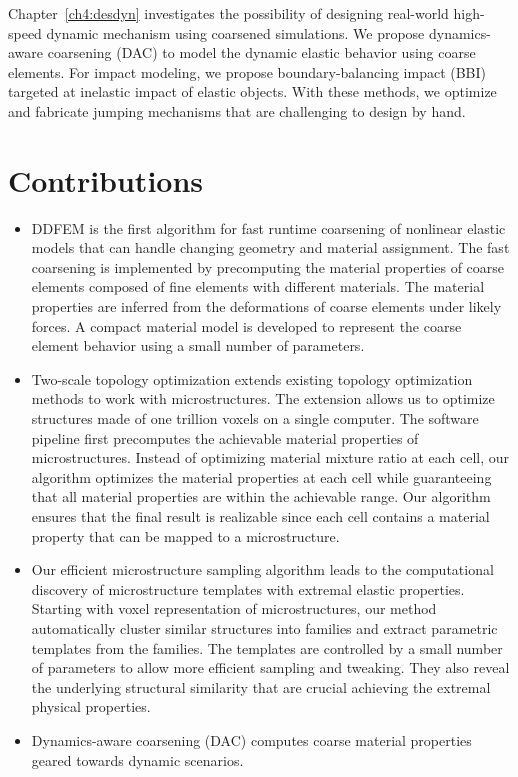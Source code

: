Chapter~\ref{ch4:desdyn} investigates the possibility of designing real-world high-speed dynamic mechanism using coarsened simulations.
We propose dynamics-aware coarsening (DAC) to model the dynamic elastic behavior using coarse elements.
For impact modeling, we propose boundary-balancing impact (BBI) targeted at inelastic impact of elastic objects.
With these methods, we optimize and fabricate jumping mechanisms that are challenging to design by hand.
\section{Contributions}
\begin{itemize}
	\item DDFEM is the first algorithm for fast runtime coarsening of nonlinear elastic models that can handle changing geometry and material assignment.
	The fast coarsening is implemented by precomputing the material properties of coarse elements composed of fine elements with different materials.
	The material properties are inferred from the deformations of coarse elements under likely forces.
	A compact material model is developed to represent the coarse element behavior using a small number of parameters.
	\item Two-scale topology optimization extends existing topology optimization methods to work with microstructures.
	The extension allows us to optimize structures made of one trillion voxels on a single computer.
	The software pipeline first precomputes the achievable material properties of microstructures.
	Instead of optimizing material mixture ratio at each cell, our algorithm optimizes the material properties at each cell while guaranteeing that all material properties are within the achievable range.
	Our algorithm ensures that the final result is realizable since each cell contains a material property that can be mapped to a microstructure.
	\item Our efficient microstructure sampling algorithm leads to the computational discovery of microstructure templates with extremal elastic properties.
	Starting with voxel representation of microstructures,
	our method automatically cluster similar structures into families and extract parametric templates from the families.
	The templates are controlled by a small number of parameters to allow more efficient sampling and tweaking.
	They also reveal the underlying structural similarity that are crucial achieving the extremal physical properties.	
	\item Dynamics-aware coarsening (DAC) computes coarse material properties geared towards dynamic scenarios.

\end{itemize}
